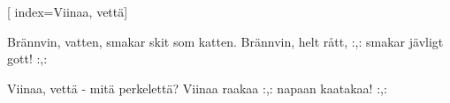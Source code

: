 [ 						
	index={Viinaa, vettä}]		
	
\beginverse*						
Brännvin, vatten,
 smakar skit som katten. 
Brännvin, helt rått,
 :,: smakar jävligt gott! :,:
\endverse
						
\beginverse				
Viinaa, vettä 
- mitä perkelettä? 
Viinaa raakaa 
:,: napaan kaatakaa! :,:
\endverse				
\endsong		
